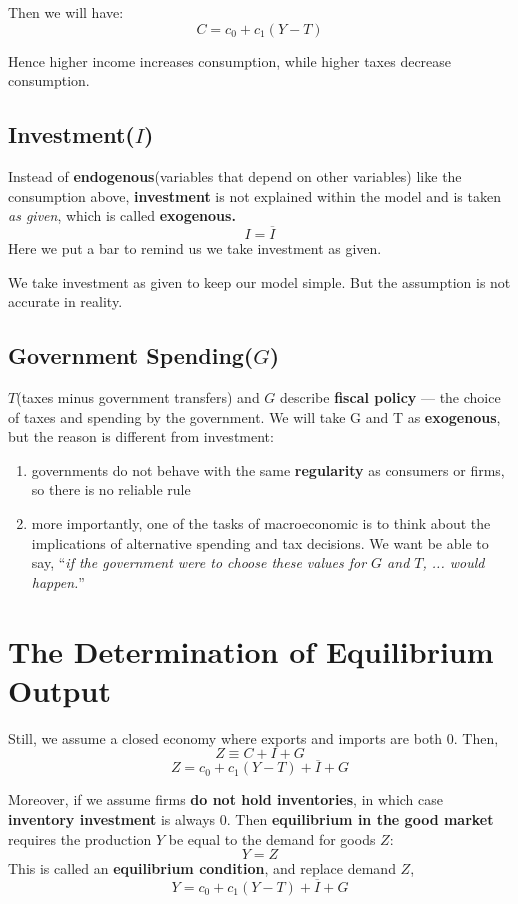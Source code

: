 \documentclass[11pt, a4paper]{ECON2123}
\begin{document}
\begin{spacing}{1.5}
    Then we will have: 
    $$C=c_0+c_1(Y-T)$$

    Hence higher income increases consumption, while higher taxes 
    decrease consumption.



    \subsection{Investment($I$)}

    Instead of {\bf endogenous}(variables that depend on other variables)
    like the consumption above, {\bf investment} is not explained within 
    the model and is taken {\it as given}, which is called {\bf exogenous.}
    $$I=\overline{I}$$
    Here we put a bar to remind us we take investment as given.

    We take investment as given to keep our model simple. 
    But the assumption is not accurate in reality.

    \subsection{Government Spending($G$)}

    $T$(taxes minus government transfers) and $G$ 
    describe {\bf fiscal policy} — the choice of taxes and spending by the 
    government. We will take G and T as {\bf exogenous}, but the reason is 
    different from investment: 
    \begin{enumerate}
        \item governments do not behave with the same {\bf regularity} as consumers 
        or firms, so there is no reliable rule
        \item more importantly, one of the tasks of macroeconomic is to think 
        about the implications of alternative spending and tax decisions. 
        We want be able to say, ``{\it if the government were to choose these 
        values for $G$ and $T$, ... would happen.}''
    \end{enumerate}

    \section{The Determination of Equilibrium Output}

    Still, we assume a closed economy where exports and imports are both 0. 
    Then,
    $$Z\equiv C+I+G$$
    $$Z=c_0+c_1(Y-T)+\overline{I}+G$$

    Moreover, if we assume firms {\bf do not hold inventories}, in which case 
    {\bf inventory investment} is always 0. Then {\bf equilibrium in the good 
    market} requires the production $Y$ be equal to the demand for goods $Z$: 
    $$Y=Z$$
    This is called an {\bf equilibrium condition}, and replace demand $Z$, 
    $$Y=c_0+c_1(Y-T)+\overline{I}+G$$


\end{spacing}
\end{document}

